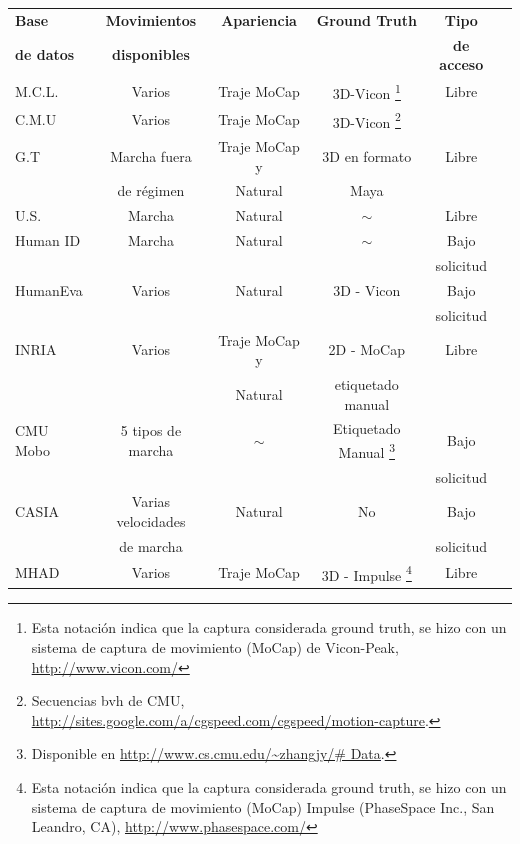 \begin{table}[h!]
\begin{minipage}{\textwidth}
\begin{tabular}{||l|ccccc||}
\rowcolor[HTML]{CBCEFB}
\textbf{Base}     & \textbf{Movimientos}  & \textbf{Apariencia}    & \textbf{Ground Truth} & \textbf{Tipo}  & \\
\rowcolor[HTML]{CBCEFB}
\textbf{de datos} & \textbf{disponibles} &               &           & \textbf{de acceso} & \\
\hline \hline
{M.C.L. }   & Varios    &  Traje MoCap & 3D-Vicon \footnote{ Esta notación indica que la captura considerada ground truth, se hizo con un sistema  de captura de movimiento (MoCap) de Vicon-Peak, \textcolor{blue}{\underline{\url{http://www.vicon.com/}}} } & Libre & \\ \hline
{C.M.U }    & Varios    &  Traje MoCap & 3D-Vicon \footnote{Secuencias bvh de CMU, \textcolor{blue}{\underline{\url{http://sites.google.com/a/cgspeed.com/cgspeed/motion-capture}}}.} & & \\ \hline
{G.T} &     Marcha fuera&     Traje MoCap y       & 3D  en formato & Libre & \\ 
 &	   de régimen  &  Natural   &   Maya & & \\ \hline
U.S. &       Marcha    &  Natural    &  $\sim$ & Libre&       \\	\hline
Human ID &     Marcha    & Natural  & $\sim$ & Bajo  &       \\ 
						 &        &   &  & solicitud &       \\ \hline
HumanEva &     Varios    & Natural  & 3D - Vicon & Bajo  &       \\ 
						 &        &   &  & solicitud &       \\ \hline
INRIA &       Varios    & Traje MoCap y            & 2D - MoCap &  Libre &       \\
&           & Natural            &   etiquetado manual  & &         \\ \hline
CMU Mobo &     5 tipos de marcha    & $\sim$           & Etiquetado Manual \footnote{Disponible en  \textcolor{blue}{\underline{\url{http://www.cs.cmu.edu/~zhangjy/\# Data}}}.}& Bajo  &       \\ 
 							 &        &   &  & solicitud &       \\ \hline
CASIA &  Varias velocidades       &   Natural         & No  &    Bajo     &      \\ 
& de marcha        &            &   & solicitud        &      \\ \hline
MHAD & Varios        & Traje MoCap            & 3D - Impulse \footnote{ Esta notación indica que la captura considerada ground truth, se hizo con un sistema  de captura de movimiento (MoCap) Impulse (PhaseSpace Inc., San Leandro, CA), \textcolor{blue}{\underline{\url{http://www.phasespace.com/}}} }    & Libre  &       \\
\hline
	\end{tabular}
	\end{minipage}	
\end{table}

